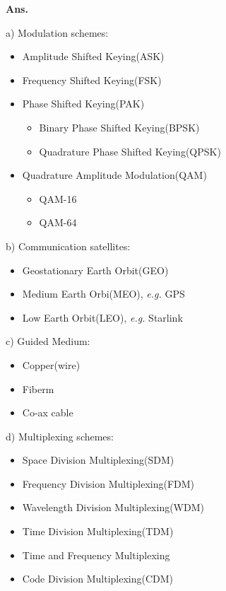 \documentclass[12pt, a4paper, UTF8, fontset=windows]{ctexbook}
\newenvironment{solution}{\par\noindent\textbf{Ans.}}{\par}
\begin{document}
\begin{solution}
    
    a) Modulation schemes: 

    \begin{itemize}
        \item Amplitude Shifted Keying(ASK)
        \item Frequency Shifted Keying(FSK)
        \item Phase Shifted Keying(PAK)
        \begin{itemize}
            \item Binary Phase Shifted Keying(BPSK)
            \item Quadrature Phase Shifted Keying(QPSK)
        \end{itemize} 
        \item Quadrature Amplitude Modulation(QAM)
        \begin{itemize}
            \item QAM-16
            \item QAM-64
        \end{itemize}
    \end{itemize}
    
    b) Communication satellites: 

    \begin{itemize}
        \item Geostationary Earth Orbit(GEO)
        \item Medium Earth Orbi(MEO), \textit{e.g.} GPS
        \item Low Earth Orbit(LEO), \textit{e.g.} Starlink
        
    \end{itemize}

    c) Guided Medium: 

    \begin{itemize}
        \item Copper(wire)
        \item Fiberm
        \item Co-ax cable
    \end{itemize}

    d) 
    Multiplexing schemes: 
    
    \begin{itemize}
        \item Space Division Multiplexing(SDM)
        \item Frequency Division Multiplexing(FDM)
        \item Wavelength Division Multiplexing(WDM)
        \item Time Division Multiplexing(TDM)
        \item Time and Frequency Multiplexing
        \item Code Division Multiplexing(CDM)
    \end{itemize}
\end{solution}
\end{document}
